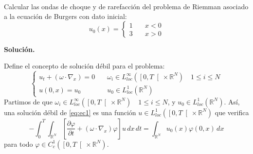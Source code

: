 \documentclass[12pt]{article}
\newcommand{\R}{\mathbb{R}}
\begin{document}
    \begin{ejercicio}
        Calcular las ondas de choque y de rarefacción del problema de Riemman asociado a la ecuación de Burgers con dato inicial:
        $$u_0(x) = \begin{cases}
            1 \quad& x<0 \\
            3 \quad& x>0
        \end{cases}$$
    \end{ejercicio}

    \newpage
    \setcounter{ejercicio}{0} %
    \noindent
    \textbf{Solución.}

    \begin{ejercicio}
        Define el concepto de solución débil para el problema:
        \begin{equation}\label{eq:ec1}
            \begin{cases}
                u_t + (\omega \cdot \nabla_x) = 0 \quad& \omega_i \in L_{loc}^{\infty}(\left[0,T\right[ \times \R^N) \quad 1 \leq i \leq N \\
                u(0,x) = u_0 \quad& u_0 \in L_{loc}^1(\R^N)
            \end{cases}
        \end{equation}
        Partimos de que $\omega_i \in L_{loc}^{\infty}(\left[0,T\right[ \times \R^N) \quad 1 \leq i \leq N$, y $u_0 \in L_{loc}^1(\R^N)$. Así, una solución débil de \eqref{eq:ec1} es una función $u \in L^1_{loc}(\left[0, T \right[ \times \R^N)$ que verifica 
        $$- \int_{0}^{T} \int_{\R^N} \left[ \dfrac{\partial \varphi}{\partial t} + (\omega \cdot \nabla_x) \varphi \right] u \,dx\,dt = \int_{\R^N} u_0(x) \varphi(0,x)\,dx$$ 
        para todo $\varphi \in C_c^1(\left[0,T \right[ \times \R^N)$.
    \end{ejercicio}
\end{document}
